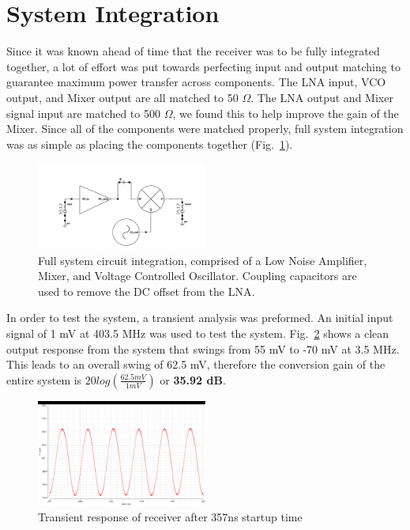 \section{System Integration}
Since it was known ahead of time that the receiver was to be fully integrated together, a lot of effort was put towards perfecting input and output matching to guarantee maximum power transfer across components. The LNA input, VCO output, and Mixer output are all matched to 50 $\Omega$. The LNA output and Mixer signal input are matched to 500 $\Omega$, we found this to help improve the gain of the Mixer. Since all of the components were matched properly, full system integration was as simple as placing the components together (Fig.~\ref{fig:fullsystem}). 

\begin{figure}[H]
   \centering
    \includegraphics[width=0.5\textwidth]{figures/FullSystem.png}
    \caption{Full system circuit integration, comprised of a Low Noise Amplifier, Mixer, and Voltage Controlled Oscillator. Coupling capacitors are used to remove the DC offset from the LNA. }
    \label{fig:fullsystem}
\end{figure}

In order to test the system, a transient analysis was preformed. An initial input signal of 1 mV at 403.5 MHz was used to test the system. Fig.~\ref{fig:fullsystemtrans} shows a clean output response from the system that swings from 55 mV to -70 mV at 3.5 MHz. This leads to an overall swing of 62.5 mV, therefore the conversion gain of the entire system is $20log(\frac{62.5 mV}{1 mV})$ or {\bf 35.92 dB}.

\begin{figure}[H]
   \centering
    \includegraphics[width=0.5\textwidth]{figures/FullSystemTrans}
    \caption{Transient response of receiver after 357ns startup time}
    \label{fig:fullsystemtrans}
\end{figure}

